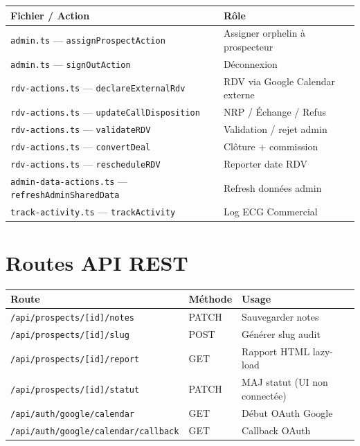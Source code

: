 \documentclass[11pt,a4paper]{report}
\begin{document}
\begin{longtable}{@{}p{4.5cm}p{9cm}@{}}
\toprule
\textbf{Fichier / Action} & \textbf{Rôle} \\
\midrule
\endhead
\texttt{admin.ts} --- \texttt{assignProspectAction} & Assigner orphelin à prospecteur \\
\texttt{admin.ts} --- \texttt{signOutAction} & Déconnexion \\
\texttt{rdv-actions.ts} --- \texttt{declareExternalRdv} & RDV via Google Calendar externe \\
\texttt{rdv-actions.ts} --- \texttt{updateCallDisposition} & NRP / Échange / Refus \\
\texttt{rdv-actions.ts} --- \texttt{validateRDV} & Validation / rejet admin \\
\texttt{rdv-actions.ts} --- \texttt{convertDeal} & Clôture + commission \\
\texttt{rdv-actions.ts} --- \texttt{rescheduleRDV} & Reporter date RDV \\
\texttt{admin-data-actions.ts} --- \texttt{refreshAdminSharedData} & Refresh données admin \\
\texttt{track-activity.ts} --- \texttt{trackActivity} & Log ECG Commercial \\
\bottomrule
\end{longtable}

\section{Routes API REST}

\begin{longtable}{@{}p{5cm}p{2cm}p{6.5cm}@{}}
\toprule
\textbf{Route} & \textbf{Méthode} & \textbf{Usage} \\
\midrule
\endhead
\texttt{/api/prospects/[id]/notes} & PATCH & Sauvegarder notes \\
\texttt{/api/prospects/[id]/slug} & POST & Générer slug audit \\
\texttt{/api/prospects/[id]/report} & GET & Rapport HTML lazy-load \\
\texttt{/api/prospects/[id]/statut} & PATCH & MAJ statut (UI non connectée) \\
\texttt{/api/auth/google/calendar} & GET & Début OAuth Google \\
\texttt{/api/auth/google/calendar/callback} & GET & Callback OAuth \\
\bottomrule
\end{longtable}

\end{document}
